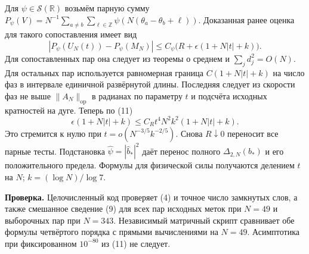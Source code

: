 \documentclass[11pt,a4paper]{article}
\newcommand{\R}{\mathbb R}
\newcommand{\Z}{\mathbb Z}
\newcommand{\subt}[1]{\par\medskip\noindent\textbf{#1.}\quad}
\newcommand{\op}{\mathrm{op}}
\begin{document}
Для \(\psi\in\mathcal S(\R)\) возьмём парную сумму \(P_\psi(V)=N^{-1}\sum_{a\ne b}\sum_{\ell\in\Z}\psi(N(\theta_a-\theta_b+\ell))\). Доказанная ранее оценка для такого сопоставления имеет вид
\[
       |P_\psi(U_N(t))-P_\psi(M_N)|
                \le C_\psi\bigl(R+\epsilon(1+N|t|+k)\bigr).
\]
Для сопоставленных пар она следует из теоремы о среднем и \(\sum_j d_j^2=O(N)\). Для остальных пар используется равномерная граница \(C(1+N|t|+k)\) на число фаз в интервале единичной развёрнутой длины. Последняя следует из скорости фаз не выше \(\|A_N\|_{\op}\) в радианах по параметру \(t\) и подсчёта исходных кратностей на дуге. Теперь по (11)
\[
            \epsilon(1+N|t|+k)\le
                      C_R t^4N^2 k^2(1+N|t|+k).
\]
Это стремится к нулю при \(t=o(N^{-3/5}k^{-2/5})\). Снова \(R\downarrow0\) переносит все парные тесты. Подстановка \(\widehat\psi=|\widehat b_*|^2\) даёт перенос полного \(\Delta_{2,N}(b_*)\) и его положительного предела. Формулы для физической силы получаются делением \(t\) на \(N\); \(k=(\log N)/\log7\).

\subt{Проверка}
Целочисленный код проверяет (4) и точное число замкнутых слов, а также смешанное сведение (9) для всех пар исходных меток при \(N=49\) и выборочных пар при \(N=343\). Независимый матричный скрипт сравнивает обе формулы четвёртого порядка с прямыми вычислениями на \(N=49\). Асимптотика при фиксированном \(10^{-80}\) из (11) не следует.
\end{document}
